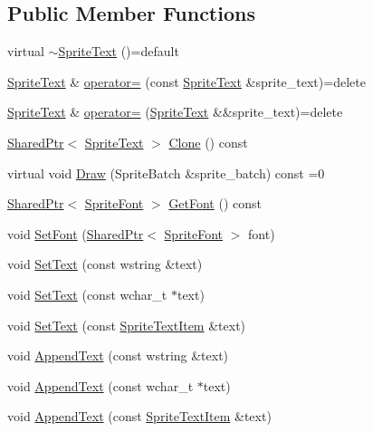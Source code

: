 \subsection*{Public Member Functions}
\begin{DoxyCompactItemize}
\item 
virtual \hyperlink{classmage_1_1_sprite_text_a0a231f260bb855b7be3280aa74a3e5c6}{$\sim$\+Sprite\+Text} ()=default
\item 
\hyperlink{classmage_1_1_sprite_text}{Sprite\+Text} \& \hyperlink{classmage_1_1_sprite_text_af027a281c1fa600dd870ca04d91fcae8}{operator=} (const \hyperlink{classmage_1_1_sprite_text}{Sprite\+Text} \&sprite\+\_\+text)=delete
\item 
\hyperlink{classmage_1_1_sprite_text}{Sprite\+Text} \& \hyperlink{classmage_1_1_sprite_text_a7e2e165d7682d9cc623b7c9725f76920}{operator=} (\hyperlink{classmage_1_1_sprite_text}{Sprite\+Text} \&\&sprite\+\_\+text)=delete
\item 
\hyperlink{namespacemage_a1e01ae66713838a7a67d30e44c67703e}{Shared\+Ptr}$<$ \hyperlink{classmage_1_1_sprite_text}{Sprite\+Text} $>$ \hyperlink{classmage_1_1_sprite_text_a14e711a43a4482aa03f6cd9d59c26c79}{Clone} () const
\item 
virtual void \hyperlink{classmage_1_1_sprite_text_a45d5ac8410d5a46b26e8491946a2ad9e}{Draw} (Sprite\+Batch \&sprite\+\_\+batch) const =0
\item 
\hyperlink{namespacemage_a1e01ae66713838a7a67d30e44c67703e}{Shared\+Ptr}$<$ \hyperlink{classmage_1_1_sprite_font}{Sprite\+Font} $>$ \hyperlink{classmage_1_1_sprite_text_a1c80933525f87fe4dced9479c1b79764}{Get\+Font} () const
\item 
void \hyperlink{classmage_1_1_sprite_text_a8e753dcd210b1fdf9c5399a9f0f3415d}{Set\+Font} (\hyperlink{namespacemage_a1e01ae66713838a7a67d30e44c67703e}{Shared\+Ptr}$<$ \hyperlink{classmage_1_1_sprite_font}{Sprite\+Font} $>$ font)
\item 
void \hyperlink{classmage_1_1_sprite_text_ac33e512ab29554a306ada9a378ab00eb}{Set\+Text} (const wstring \&text)
\item 
void \hyperlink{classmage_1_1_sprite_text_a03d5012e2812d422a1285a4a0abb104f}{Set\+Text} (const wchar\+\_\+t $\ast$text)
\item 
void \hyperlink{classmage_1_1_sprite_text_ab9f28cf44b29b8489794938a8965f104}{Set\+Text} (const \hyperlink{structmage_1_1_sprite_text_item}{Sprite\+Text\+Item} \&text)
\item 
void \hyperlink{classmage_1_1_sprite_text_acf993532a7b2e6ebb761b9b47cbdba98}{Append\+Text} (const wstring \&text)
\item 
void \hyperlink{classmage_1_1_sprite_text_a462809b9138f94720f972505a4f74d81}{Append\+Text} (const wchar\+\_\+t $\ast$text)
\item 
void \hyperlink{classmage_1_1_sprite_text_a6f0bb93c634d9b05466d3998bcaf957a}{Append\+Text} (const \hyperlink{structmage_1_1_sprite_text_item}{Sprite\+Text\+Item} \&text)
\end{DoxyCompactItemize}
